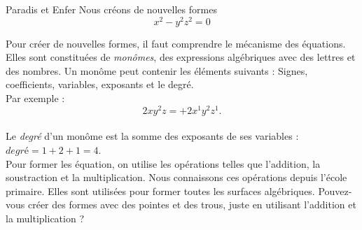 \begin{surferPage}{Paradis et Enfer}
Nous créons de nouvelles formes \\
\smallskip
\[x^2	- y^2z^2	= 0\]

\singlespacing
Pour créer de nouvelles formes, il faut comprendre le mécanisme des équations. Elles sont constituées de {\it monômes}, des expressions algébriques avec des lettres et des nombres.
\singlespacing
Un monôme peut contenir les éléments suivants :
Signes, coefficients, variables, exposants et le degré.\\
\singlespacing
Par exemple : 
\smallskip
\[2xy^2z = +2x^1y^2z^1.\]
\\
\smallskip
Le {\it degré} d'un monôme est la somme des exposants de ses variables : $degré = 1+2+1=4$.  \\
\singlespacing
Pour former les équation, on utilise les opérations telles que l'addition, la soustraction et la multiplication. Nous connaissons ces opérations depuis l'école primaire. Elles sont utilisées pour former toutes les surfaces algébriques.
\singlespacing
Pouvez-vous créer des formes avec des pointes et des trous, juste en utilisant l'addition et la multiplication ?
\end{surferPage}
